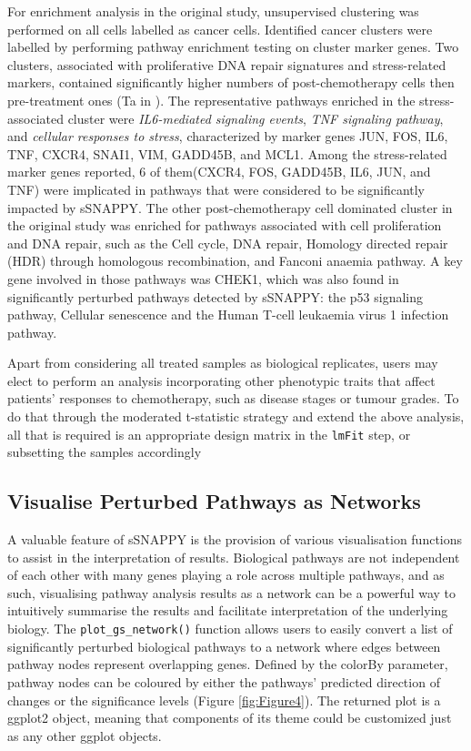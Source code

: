 \documentclass[9pt,a4paper,]{extarticle}
\begin{document}
For enrichment analysis in the original study\citep{Zhang2022}, unsupervised clustering was performed on all cells labelled as cancer cells.
Identified cancer clusters were labelled by performing pathway enrichment testing on cluster marker genes.
Two clusters, associated with proliferative DNA repair signatures and stress-related markers, contained significantly higher numbers of post-chemotherapy cells then pre-treatment ones (Ta in \citep{Zhang2022}).
The representative pathways enriched in the stress-associated cluster were \emph{IL6-mediated signaling events}, \emph{TNF signaling pathway}, and \emph{cellular responses to stress}, characterized by marker genes JUN, FOS, IL6, TNF, CXCR4, SNAI1, VIM, GADD45B, and MCL1.
Among the stress-related marker genes reported, 6 of them(CXCR4, FOS, GADD45B, IL6, JUN, and TNF) were implicated in pathways that were considered to be significantly impacted by sSNAPPY.
The other post-chemotherapy cell dominated cluster in the original study was enriched for pathways associated with cell proliferation and DNA repair, such as the Cell cycle, DNA repair, Homology directed repair (HDR) through homologous recombination, and Fanconi anaemia pathway.
A key gene involved in those pathways was CHEK1, which was also found in significantly perturbed pathways detected by sSNAPPY: the p53 signaling pathway, Cellular senescence and the Human T-cell leukaemia virus 1 infection pathway.

Apart from considering all treated samples as biological replicates, users may elect to perform an analysis incorporating other phenotypic traits that affect patients' responses to chemotherapy, such as disease stages or tumour grades.
To do that through the moderated t-statistic strategy and extend the above analysis, all that is required is an appropriate design matrix in the \texttt{lmFit} step, or subsetting the samples accordingly

\hypertarget{visualise-perturbed-pathways-as-networks}{%
\subsection{Visualise Perturbed Pathways as Networks}\label{visualise-perturbed-pathways-as-networks}}

A valuable feature of sSNAPPY is the provision of various visualisation functions to assist in the interpretation of results.
Biological pathways are not independent of each other with many genes playing a role across multiple pathways, and as such, visualising pathway analysis results as a network can be a powerful way to intuitively summarise the results and facilitate interpretation of the underlying biology.
The \texttt{plot\_gs\_network()} function allows users to easily convert a list of significantly perturbed biological pathways to a network where edges between pathway nodes represent overlapping genes.
Defined by the colorBy parameter, pathway nodes can be coloured by either the pathways' predicted direction of changes or the significance levels (Figure \ref{fig:Figure4}).
The returned plot is a ggplot2 \citep{Wickham2009} object, meaning that components of its theme could be customized just as any other ggplot objects.
\end{document}
